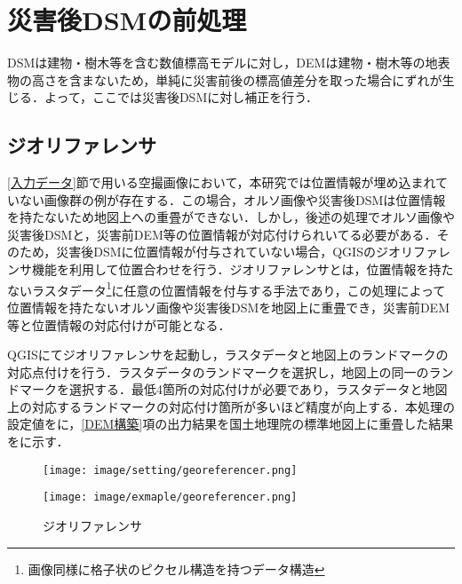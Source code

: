  \section{災害後DSMの前処理}
    \label{災害後DSMの前処理}
    DSMは建物・樹木等を含む数値標高モデルに対し，DEMは建物・樹木等の地表物の高さを含まないため，単純に災害前後の標高値差分を取った場合にずれが生じる．よって，ここでは災害後DSMに対し補正を行う．


    \subsection{ジオリファレンサ}
      \label{ジオリファレンサ}
      \ref{入力データ}節で用いる空撮画像において，本研究では位置情報が埋め込まれていない画像群の例が存在する．この場合，オルソ画像や災害後DSMは位置情報を持たないため地図上への重畳ができない．しかし，後述の処理でオルソ画像や災害後DSMと，災害前DEM等の位置情報が対応付けられいてる必要がある．そのため，災害後DSMに位置情報が付与されていない場合，QGISのジオリファレンサ機能を利用して位置合わせを行う．ジオリファレンサとは，位置情報を持たないラスタデータ\footnote{画像同様に格子状のピクセル構造を持つデータ構造}に任意の位置情報を付与する手法であり，この処理によって位置情報を持たないオルソ画像や災害後DSMを地図上に重畳でき，災害前DEM等と位置情報の対応付けが可能となる．

      QGISにてジオリファレンサを起動し，ラスタデータと地図上のランドマークの対応点付けを行う．ラスタデータのランドマークを選択し，地図上の同一のランドマークを選択する．最低4箇所の対応付けが必要であり，ラスタデータと地図上の対応するランドマークの対応付け箇所が多いほど精度が向上する．本処理の設定値をに，\ref{DEM構築}項の出力結果を国土地理院の標準地図\cite{標準地図}上に重畳した結果をに示す．

      \begin{figure}[t]
        \begin{minipage}[c]{0.45\hsize}
          \centering
          \texttt{[image: image/setting/georeferencer.png]}
          \label{ジオリファレンサ設定値}
        \end{minipage}
        \begin{minipage}[c]{0.45\hsize}
          \centering
          \texttt{[image: image/exmaple/georeferencer.png]}
          \label{ジオリファレンサ結果}
        \end{minipage}
        \caption{ジオリファレンサ}
      \end{figure}


